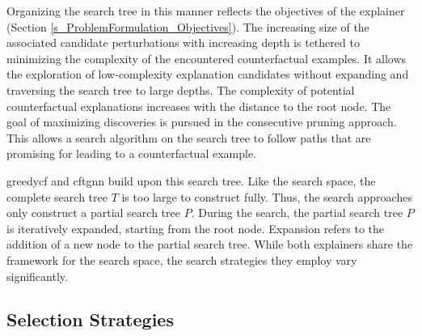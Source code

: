Organizing the search tree in this manner reflects the objectives of the explainer (Section \ref{s_ProblemFormulation_Objectives}). The increasing size of the associated candidate perturbations with increasing depth is tethered to minimizing the complexity of the encountered counterfactual examples. It allows the exploration of low-complexity explanation candidates without expanding and traversing the search tree to large depths. The complexity of potential counterfactual explanations increases with the distance to the root node. The goal of maximizing discoveries is pursued in the consecutive pruning approach. This allows a search algorithm on the search tree to follow paths that are promising for leading to a counterfactual example.

\gls{greedycf} and \gls{cftgnn} build upon this search tree. Like the search space, the complete search tree $T$ is too large to construct fully. Thus, the search approaches only construct a partial search tree $P$. During the search, the partial search tree $P$ is iteratively expanded, starting from the root node. Expansion refers to the addition of a new node to the partial search tree. While both explainers share the framework for the search space, the search strategies they employ vary significantly.


\FloatBarrier
\subsection{Selection Strategies}
\label{s_Methodology_SelectionStrategies}

